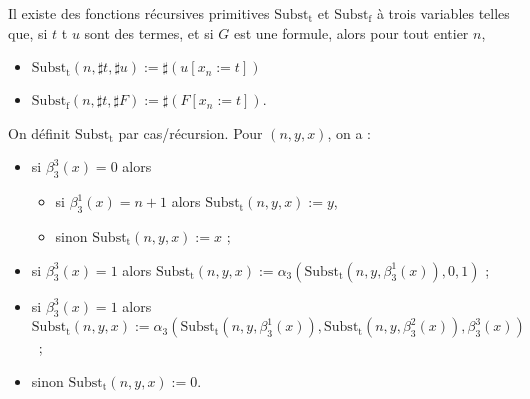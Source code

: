 \documentclass[./main]{subfiles}
\begin{document}
 \begin{lem}[Substitutions]
   Il existe des fonctions récursives primitives $\mathrm{Subst_t}$ et $\mathrm{Subst_f}$ à trois variables telles que, si $t$ t $u$ sont des termes, et si $G$ est une formule, alors pour tout entier $n$, 
   \begin{itemize}
     \item $\mathrm{Subst_t}(n, \sharp t, \sharp u) := \sharp (u[x_n := t])$
     \item $\mathrm{Subst_f}(n, \sharp t, \sharp F) := \sharp (F[x_n := t])$.
   \end{itemize}
 \end{lem}
 \begin{prv}
   On définit $\mathrm{Subst_t}$ par cas/récursion. Pour $(n, y, x)$, on a  :
   \begin{itemize}
     \item si $\beta_3^3(x) = 0$  alors
       \begin{itemize}
         \item si $\beta_3^1(x) = n+1$ alors  $\mathrm{Subst_t}(n, y, x) := y$,
         \item sinon $\mathrm{Subst_t}(n, y, x) := x$ ;
       \end{itemize}
     \item si $\beta_3^3(x) = 1$ alors $\mathrm{Subst_t}(n, y, x) := \alpha_3(\mathrm{Subst_t}(n, y, \beta_3^1(x)), 0, 1)$ ;
     \item si $\beta_3^3(x) = 1$ alors\\ {\small $\mathrm{Subst_t}(n, y, x) := \alpha_3(\mathrm{Subst_t}(n, y, \beta_3^1(x)), \mathrm{Subst_t}(n, y, \beta_3^2(x)), \beta_3^3(x))$}~;
     \item sinon $\mathrm{Subst_t}(n, y, x) := 0$.
   \end{itemize}


\end{prv}
\end{document}
